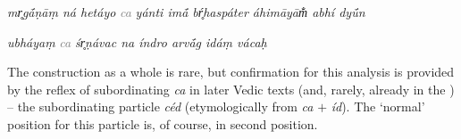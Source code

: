 \documentclass[output=paper,
modfonts
]{LSP/langsci}
\begin{document}
\begin{exe}
	\ex
	\begin{xlist}
		\ex
{\ob} \textit{mr̥gā́ṇāṃ ná hetáyo}{\cb} {\ob} {\textcolor{gray}{\textit{ca}}} {\ob}\textit{yánti  imā́ bŕ̥haspáter áhimāyām̐ abhí dyū́n}{\cb}{\cb}
\vspace{.07in}

\ex
{\ob} \textit{ubháyaṃ}{\cb} {\ob} {\textcolor{gray}{\textit{ca}}} {\ob}\textit{śr̥ṇávac  na índro arvā́g idáṃ vácaḥ}{\cb}{\cb} 
\end{xlist}
\end{exe}

The construction as a whole is rare, but confirmation for this analysis is provided by the reflex of subordinating
\textit{ca} in later Vedic texts (and, rarely, already in the ) -- the subordinating particle \textit{céd} (etymologically from \textit{ca} $+$ 
\textit{íd}). The `normal'
position for this particle is, of course, in second position.

\end{document}
